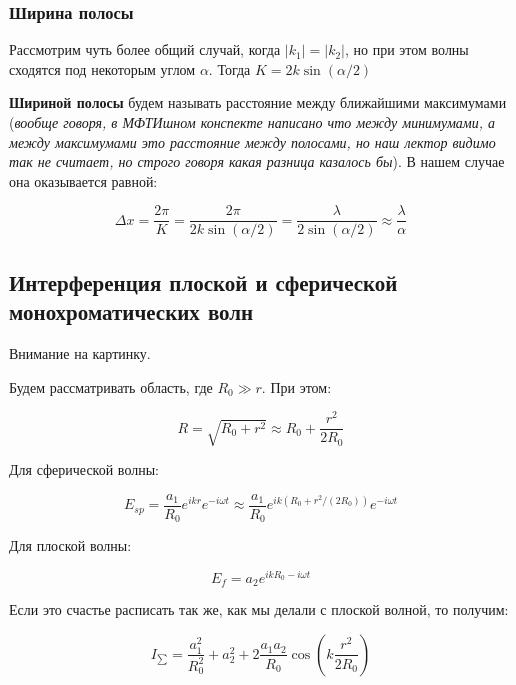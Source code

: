 \subsubsection{Ширина полосы}

Рассмотрим чуть более общий случай, когда $|k_1| = |k_2|$, но при этом волны сходятся под некоторым углом $\alpha$. Тогда $K = 2 k \sin(\alpha/2)$

\textbf{Шириной полосы} будем называть расстояние между ближайшими максимумами (\textit{вообще говоря, в МФТИшном конспекте написано что между минимумами, а между максимумами это расстояние между полосами, но наш лектор видимо так не считает, но строго говоря какая разница казалось бы}). В нашем случае она оказывается равной:

\begin{equation*}
	\Delta x = \frac{2\pi}{K} = \frac{2 \pi}{2 k \sin(\alpha/2)} = \frac{\lambda}{2\sin(\alpha/2)} \approx \frac{\lambda}{\alpha}
\end{equation*}

\subsection{Интерференция плоской и сферической монохроматических волн}

Внимание на картинку. %

Будем рассматривать область, где $R_0 \gg r$. При этом:

\begin{equation*}
	R = \sqrt{R_0 + r^2} \approx R_0 + \frac{r^2}{2R_0}
\end{equation*}

Для сферической волны:

\begin{equation*}
	E_{sp} = \frac{a_1}{R_0} e^{i k r} e^{-i \omega t} \approx \frac{a_1}{R_0} e^{i k (R_0 + r^2 / (2 R_0))} e^{-i \omega t}
\end{equation*}

Для плоской волны:

\begin{equation*}
	E_{f} = a_2 e^{i k R_0  - i \omega t}
\end{equation*}

Если это счастье расписать так же, как мы делали с плоской волной, то получим:

\begin{equation*}
	I_{\sum} = \frac{a_1^2}{R_0^2} + a_2^2  + 2 \frac{a_1 a_2}{R_0} \cos \left(k \frac{r^2}{2 R_0}\right)
\end{equation*}

